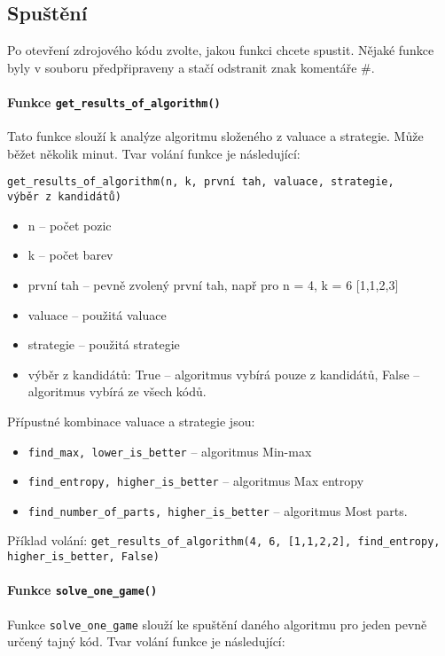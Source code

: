 \documentclass[12pt,a4paper]{article}
\begin{document}
\subsection{Spuštění}

Po otevření zdrojového kódu zvolte, jakou funkci chcete spustit. Nějaké funkce byly v souboru předpřipraveny a stačí odstranit znak komentáře \#. 
\paragraph{Funkce \texttt{get\_results\_of\_algorithm()}}
Tato funkce slouží k analýze algoritmu složeného z valuace a strategie. Může běžet několik minut. Tvar volání funkce je následující:

\texttt{get\_results\_of\_algorithm(n, k, první tah, valuace, strategie,}\\
\texttt{výběr z kandidátů)}
\begin{itemize}
    \item n -- počet pozic
    \item k -- počet barev
    \item první tah -- pevně zvolený první tah, např pro n = 4, k = 6 [1,1,2,3]
    \item valuace -- použitá valuace
    \item strategie -- použitá strategie
    \item výběr z kandidátů: True -- algoritmus vybírá pouze z kandidátů, 
        False -- algoritmus vybírá ze všech kódů.
\end{itemize}


Přípustné kombinace valuace a strategie jsou:
\begin{itemize}
    \item \texttt{find\_max, lower\_is\_better} -- algoritmus Min-max
    \item \texttt{find\_entropy, higher\_is\_better} -- algoritmus Max entropy
    \item \texttt{find\_number\_of\_parts, higher\_is\_better} -- algoritmus Most parts.
\end{itemize}
Příklad volání:
\texttt{get\_results\_of\_algorithm(4, 6, [1,1,2,2], find\_entropy, higher\_is\_better, False)}

\paragraph{Funkce \texttt{solve\_one\_game()}}
Funkce \texttt{solve\_one\_game} slouží ke spuštění daného algoritmu pro jeden pevně určený tajný kód. Tvar volání funkce je následující:
\end{document}
